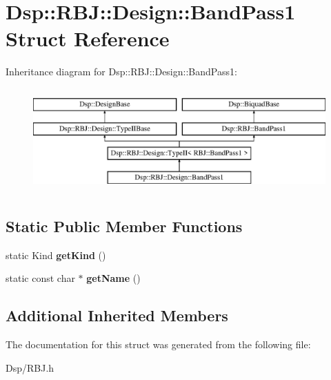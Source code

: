 \hypertarget{structDsp_1_1RBJ_1_1Design_1_1BandPass1}{\section{Dsp\-:\-:R\-B\-J\-:\-:Design\-:\-:Band\-Pass1 Struct Reference}
\label{structDsp_1_1RBJ_1_1Design_1_1BandPass1}
}
Inheritance diagram for Dsp\-:\-:R\-B\-J\-:\-:Design\-:\-:Band\-Pass1\-:\begin{figure}[H]
\begin{center}
\leavevmode
\includegraphics[height=4.000000cm]{structDsp_1_1RBJ_1_1Design_1_1BandPass1}
\end{center}
\end{figure}
\subsection*{Static Public Member Functions}
\begin{DoxyCompactItemize}
\item 
\hypertarget{structDsp_1_1RBJ_1_1Design_1_1BandPass1_a42167f9f5621bdad086d0440382a6c85}{static Kind {\bfseries get\-Kind} ()}\label{structDsp_1_1RBJ_1_1Design_1_1BandPass1_a42167f9f5621bdad086d0440382a6c85}

\item 
\hypertarget{structDsp_1_1RBJ_1_1Design_1_1BandPass1_af9f21e9c1517ace1d77694edc819b7af}{static const char $\ast$ {\bfseries get\-Name} ()}\label{structDsp_1_1RBJ_1_1Design_1_1BandPass1_af9f21e9c1517ace1d77694edc819b7af}

\end{DoxyCompactItemize}
\subsection*{Additional Inherited Members}


The documentation for this struct was generated from the following file\-:\begin{DoxyCompactItemize}
\item 
Dsp/R\-B\-J.\-h\end{DoxyCompactItemize}
